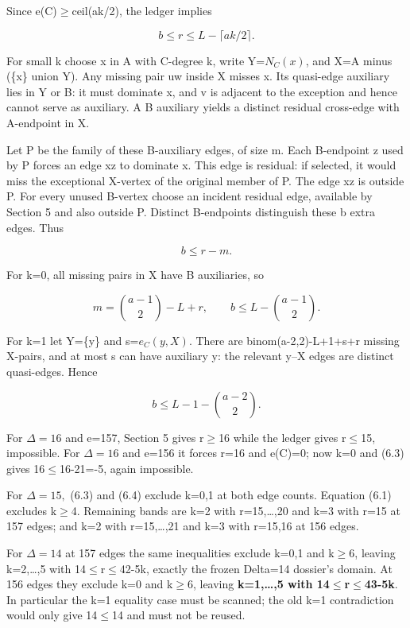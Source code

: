 \documentclass[
  11pt,
]{article}
\begin{document}
Since e(C)\ensuremath{\ge}ceil(ak/2), the ledger implies

\[
b\le r\le L-\lceil ak/2\rceil. \tag{6.1}
\]

For small k choose x in A with C-degree k, write Y=\ensuremath{N_C(x)},
and X=A minus (\{x\} union Y). Any missing pair uw inside X misses x.
Its quasi-edge auxiliary lies in Y or B: it must dominate x, and v is
adjacent to the exception and hence cannot serve as auxiliary. A B
auxiliary yields a distinct residual cross-edge with A-endpoint in X.

Let P be the family of these B-auxiliary edges, of size m. Each
B-endpoint z used by P forces an edge xz to dominate x. This edge is
residual: if selected, it would miss the exceptional X-vertex of the
original member of P. The edge xz is outside P. For every unused
B-vertex choose an incident residual edge, available by Section 5 and
also outside P. Distinct B-endpoints distinguish these b extra edges.
Thus

\[
b\le r-m. \tag{6.2}
\]

For k=0, all missing pairs in X have B auxiliaries, so

\[
m=\binom{a-1}{2}-L+r,
\qquad b\le L-\binom{a-1}{2}. \tag{6.3}
\]

For k=1 let Y=\{y\} and s=\ensuremath{e_C(y,X)}. There are
binom(a-2,2)-L+1+s+r missing X-pairs, and at most s can have auxiliary
y: the relevant y--X edges are distinct quasi-edges. Hence

\[
b\le L-1-\binom{a-2}{2}. \tag{6.4}
\]

For \ensuremath{\Delta =16} and e=157, Section 5 gives
r\ensuremath{\ge}16 while the ledger gives r\ensuremath{\le}15,
impossible. For \ensuremath{\Delta =16} and e=156 it forces r=16 and
e(C)=0; now k=0 and (6.3) gives 16\ensuremath{\le}16-21=-5, again
impossible.

For \ensuremath{\Delta =15,} (6.3) and (6.4) exclude k=0,1 at both edge
counts. Equation (6.1) excludes k\ensuremath{\ge}4. Remaining bands are
k=2 with r=15,\ldots,20 and k=3 with r=15 at 157 edges; and k=2 with
r=15,\ldots,21 and k=3 with r=15,16 at 156 edges.

For \ensuremath{\Delta =14} at 157 edges the same inequalities exclude
k=0,1 and k\ensuremath{\ge}6, leaving k=2,\ldots,5 with
14\ensuremath{\le}r\ensuremath{\le}42-5k, exactly the frozen Delta=14
dossier's domain. At 156 edges they exclude k=0 and k\ensuremath{\ge}6,
leaving \textbf{k=1,\ldots,5 with
14\ensuremath{\le}r\ensuremath{\le}43-5k}. In particular the k=1
equality case must be scanned; the old k=1 contradiction would only give
14\ensuremath{\le}14 and must not be reused.
\end{document}
